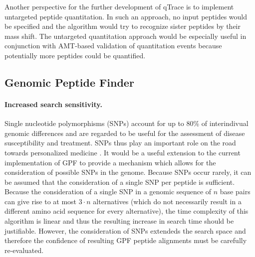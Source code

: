 Another perspective for the further development of qTrace is to implement
untargeted peptide quantitation. 
In such an approach, no input peptides would be specified and the algorithm
would try to recognize sister peptides by their mass shift.
The untargeted quantitation approach would be especially useful in conjunction
with AMT-based validation of quantitation events because potentially more 
peptides could be quantified.

\subsection{Genomic Peptide Finder}

\paragraph{Increased search sensitivity.}

Single nucleotide polymorphisms (SNPs) account for up to 80\% of interindivual
genomic differences and are regarded to be useful for the assessment of disease
susceptibility and treatment.
SNPs thus play an important role on the road towards personalized medicine 
\citep{Carlson2008}.
It would be a useful extension to the current implementation of GPF to provide 
a mechanism which allows for the consideration of possible SNPs in the genome.
Because SNPs occur rarely, it can be assumed that the consideration of a single
SNP per peptide is sufficient.
Because the consideration of a single SNP in a genomic sequence of $n$ base pairs
can give rise to at most $3 \cdot n$ alternatives (which do not necessarily
result in a different amino acid sequence for every alternative), the time 
complexity of this algorithm is linear and thus the resulting increase in 
search time should be justifiable.
However, the consideration of SNPs extendeds the search space and therefore
the confidence of resulting GPF peptide alignments must be carefully 
re-evaluated.
